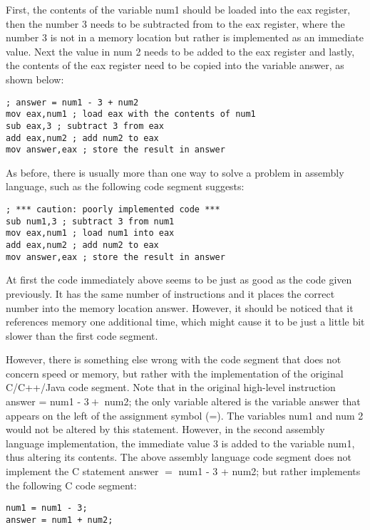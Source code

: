 \documentclass[10pt]{article}
\begin{document}
First, the contents of the variable num1 should be loaded into the eax register, then the number 3 needs to be subtracted from to the eax register, where the number 3 is not in a memory location but rather is implemented as an immediate\\
value. Next the value in num 2 needs to be added to the eax register and lastly, the contents of the eax register need to be copied into the variable answer, as shown below:

\begin{verbatim}
; answer = num1 - 3 + num2
mov eax,num1 ; load eax with the contents of num1
sub eax,3 ; subtract 3 from eax
add eax,num2 ; add num2 to eax
mov answer,eax ; store the result in answer
\end{verbatim}

As before, there is usually more than one way to solve a problem in assembly language, such as the following code segment suggests:

\begin{verbatim}
; *** caution: poorly implemented code ***
sub num1,3 ; subtract 3 from num1
mov eax,num1 ; load num1 into eax
add eax,num2 ; add num2 to eax
mov answer,eax ; store the result in answer
\end{verbatim}

At first the code immediately above seems to be just as good as the code given previously. It has the same number of instructions and it places the correct number into the memory location answer. However, it should be noticed that it references memory one additional time, which might cause it to be just a little bit slower than the first code segment.

However, there is something else wrong with the code segment that does not concern speed or memory, but rather with the implementation of the original C/C++/Java code segment. Note that in the original high-level instruction answer = num1 - $3+$ num2; the only variable altered is the variable answer that appears on the left of the assignment symbol (=). The variables num1 and num 2 would not be altered by this statement. However, in the second assembly language implementation, the immediate value 3 is added to the variable num1, thus altering its contents. The above assembly language code segment does not implement the C statement answer $=$ num1 - 3 + num2; but rather implements the following C code segment:

\begin{verbatim}
num1 = num1 - 3;
answer = num1 + num2;
\end{verbatim}
\end{document}

